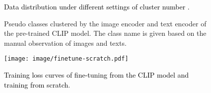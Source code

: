 \documentclass{article} \usepackage{iclr2023_conference,times}
\begin{document}
\begin{figure}
\centering
{}
\caption{\textcolor{black}{Data distribution under different settings of cluster number .}}
\vspace{-6mm}
\label{fig:kmeansa}
\end{figure}

\begin{figure}
\centering
{}
\hfill
{}
\hfill
{}

\hfill
{}
\hfill
{}
\vspace{-2mm}
\caption{Pseudo classes clustered by the image encoder and text encoder of the pre-trained CLIP model. The class name is given based on the manual observation of images and texts.}
\vspace{-6mm}
\label{fig1:cluteringappedixa}
\end{figure}



\begin{figure}
\centering
\texttt{[image: image/finetune-scratch.pdf]}
\caption{\textcolor{black}{Training loss curves of fine-tuning from the CLIP model and training from scratch.}}
\label{fig:finetune}
\end{figure}
\end{document}

